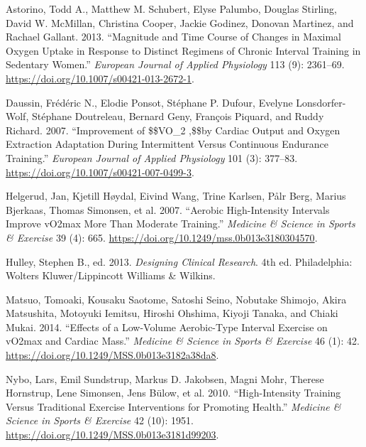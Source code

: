 \documentclass[
  letterpaper,
  DIV=11,
  numbers=noendperiod]{scrartcl}
\newlength{\cslhangindent}
\newlength{\cslentryspacingunit} %
\newenvironment{CSLReferences}[2] %
 {%
  \setlength{\parindent}{0pt}
  \ifodd #1
  \let\oldpar\par
  \def\par{\hangindent=\cslhangindent\oldpar}
  \fi
  \setlength{\parskip}{#2\cslentryspacingunit}
 }%
 {}
\begin{document}
\hypertarget{refs}{}
\begin{CSLReferences}{1}{0}
\leavevmode{}%
Astorino, Todd A., Matthew M. Schubert, Elyse Palumbo, Douglas Stirling,
David W. McMillan, Christina Cooper, Jackie Godinez, Donovan Martinez,
and Rachael Gallant. 2013. {``Magnitude and Time Course of Changes in
Maximal Oxygen Uptake in Response to Distinct Regimens of Chronic
Interval Training in Sedentary Women.''} \emph{European Journal of
Applied Physiology} 113 (9): 2361--69.
\url{https://doi.org/10.1007/s00421-013-2672-1}.

\leavevmode{}%
Daussin, Frédéric N., Elodie Ponsot, Stéphane P. Dufour, Evelyne
Lonsdorfer-Wolf, Stéphane Doutreleau, Bernard Geny, François Piquard,
and Ruddy Richard. 2007. {``Improvement of
{\$}{\$}\dot{\textbraceleft}V{\textbraceright}\hbox{\textbraceleft}O{\textbraceright}{\_}{\textbraceleft}2
\max{\textbraceright},{\$}{\$}by Cardiac Output and Oxygen Extraction
Adaptation During Intermittent Versus Continuous Endurance Training.''}
\emph{European Journal of Applied Physiology} 101 (3): 377--83.
\url{https://doi.org/10.1007/s00421-007-0499-3}.

\leavevmode{}%
Helgerud, Jan, Kjetill Høydal, Eivind Wang, Trine Karlsen, Pålr Berg,
Marius Bjerkaas, Thomas Simonsen, et al. 2007. {``Aerobic High-Intensity
Intervals Improve v{\textperiodcentered}O2max More Than Moderate
Training.''} \emph{Medicine \& Science in Sports \& Exercise} 39 (4):
665. \url{https://doi.org/10.1249/mss.0b013e3180304570}.

\leavevmode{}%
Hulley, Stephen B., ed. 2013. \emph{Designing Clinical Research}. 4th
ed. Philadelphia: Wolters Kluwer/Lippincott Williams \& Wilkins.

\leavevmode{}%
Matsuo, Tomoaki, Kousaku Saotome, Satoshi Seino, Nobutake Shimojo, Akira
Matsushita, Motoyuki Iemitsu, Hiroshi Ohshima, Kiyoji Tanaka, and Chiaki
Mukai. 2014. {``Effects of a Low-Volume Aerobic-Type Interval Exercise
on v{\textperiodcentered}O2max and Cardiac Mass.''} \emph{Medicine \&
Science in Sports \& Exercise} 46 (1): 42.
\url{https://doi.org/10.1249/MSS.0b013e3182a38da8}.

\leavevmode{}%
Nybo, Lars, Emil Sundstrup, Markus D. Jakobsen, Magni Mohr, Therese
Hornstrup, Lene Simonsen, Jens Bülow, et al. 2010. {``High-Intensity
Training Versus Traditional Exercise Interventions for Promoting
Health.''} \emph{Medicine \& Science in Sports \& Exercise} 42 (10):
1951. \url{https://doi.org/10.1249/MSS.0b013e3181d99203}.

\end{CSLReferences}
\end{document}
